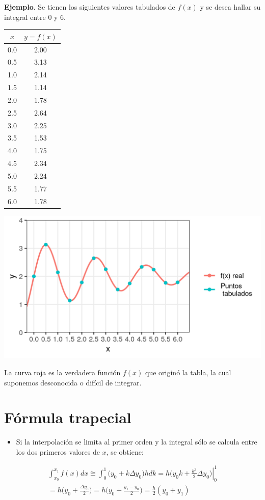 \documentclass[openany]{book}
\providecommand{\tightlist}{%
  \setlength{\itemsep}{0pt}\setlength{\parskip}{0pt}}
\begin{document}
\textbf{Ejemplo}. Se tienen los siguientes valores tabulados de \(f(x)\) y se desea hallar su integral entre 0 y 6.

\begin{longtable}[]{@{}cc@{}}
\toprule
\(x\) & \(y=f(x)\)\tabularnewline
\midrule
\endhead
0.0 & 2.00\tabularnewline
0.5 & 3.13\tabularnewline
1.0 & 2.14\tabularnewline
1.5 & 1.14\tabularnewline
2.0 & 1.78\tabularnewline
2.5 & 2.64\tabularnewline
3.0 & 2.25\tabularnewline
3.5 & 1.53\tabularnewline
4.0 & 1.75\tabularnewline
4.5 & 2.34\tabularnewline
5.0 & 2.24\tabularnewline
5.5 & 1.77\tabularnewline
6.0 & 1.78\tabularnewline
\bottomrule
\end{longtable}

\begin{center}\includegraphics[width=1\linewidth]{Plots/U4/Unidad4_2_g} \end{center}

La curva roja es la verdadera función \(f(x)\) que originó la tabla, la cual suponemos desconocida o difícil de integrar.

\hypertarget{fuxf3rmula-trapecial}{%
\section{Fórmula trapecial}\label{fuxf3rmula-trapecial}}

\begin{itemize}
\tightlist
\item
  Si la interpolación se limita al primer orden y la integral sólo se calcula entre los dos primeros valores de \(x\), se obtiene:
\end{itemize}

\begin{gather*}
\int_{x_0}^{x_1} f(x)dx \cong  \int_{0}^{1} \Big( y_0 + k \Delta y_0 \Big) hdk = h \left. \Big( y_0 k + \frac{k^2}{2} \Delta y_0 \Big) \right\vert_{0}^{1} \\
= h \Big( y_0 + \frac{\Delta y_0}{2} \Big) = h \Big( y_0 + \frac{y_1 - y_0}{2} \Big) = \frac{h}{2} (y_0 + y_1)
\end{gather*}
\end{document}
